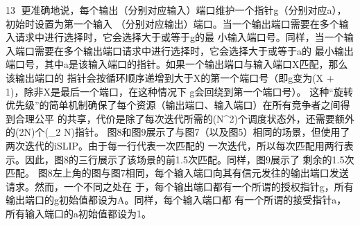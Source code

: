                                                    13
更准确地说，每个输出（分别对应输入）端口维护一个指针g（分别对应a），初始时设置为第一个输入
（分别对应输出）端口。当一个输出端口需要在多个输入请求中进行选择时，它会选择大于或等于g的最
小输入端口号。同样，当一个输入端口需要在多个输出端口请求中进行选择时，它会选择大于或等于a的
最小输出端口号，其中a是该输入端口的指针。如果一个输出端口与输入端口X匹配，那么该输出端口的
指针会按循环顺序递增到大于X的第一个端口号（即g变为(X + 1)，除非X是最后一个端口，在这种情况下
g会回绕到第一个端口号）。
这种“旋转优先级”的简单机制确保了每个资源（输出端口、输入端口）在所有竞争者之间得到合理公平
的共享，代价是除了每次迭代所需的(N^{2})个调度状态外，还需要额外的(2N)个(\log _{2} N)指针。
图8和图9展示了与图7（以及图5）相同的场景，但使用了两次迭代的iSLIP。由于每一行代表一次匹配的
一次迭代，所以每次匹配用两行表示。因此，图8的三行展示了该场景的前1.5次匹配。同样，图9展示了
剩余的1.5次匹配。
图8左上角的图与图7相同，每个输入端口向其有信元发往的输出端口发送请求。然而，一个不同之处在
于，每个输出端口都有一个所谓的授权指针g，所有输出端口的g初始值都设为A。同样，每个输入端口都
有一个所谓的接受指针a，所有输入端口的a初始值都设为1。




